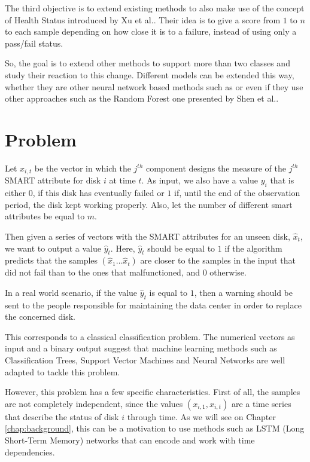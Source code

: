 The third objective is to extend existing methods to also make use of the concept of Health Status introduced by Xu et al.\cite{Xu16}.
Their idea is to give a score from $1$ to $n$ to each sample depending on how close it is to a failure, instead of using only a pass/fail status.

So, the goal is to extend other methods to support more than two classes and study their reaction to this change.
Different models can be extended this way, whether they are other neural network based methods such as \cite{Zhu13} or even if they use other approaches such as the Random Forest one presented by Shen et al.\cite{Shen18}.  

\section{Problem}\label{sec:problem}

Let $x_{i,t}$ be the vector in which the $j^{th}$ component designs the measure of the $j^{th}$ SMART attribute for disk $i$ at time $t$.
As input, we also have a value $y_i$ that is either $0$, if this disk has eventually failed or $1$ if, until the end of the observation period, the disk kept working properly.
Also, let the number of different smart attributes be equal to $m$.

Then given a series of vectors with the SMART attributes for an unseen disk, $\hat{x}_t$, we want to output a value $\hat{y}_t$.
Here, $\hat{y}_t$ should be equal to $1$ if the algorithm predicts that the samples $\left(\hat{x}_1\dots\hat{x}_t\right)$ are closer to the samples in the input that did not fail than to the ones that malfunctioned, and $0$ otherwise.

In a real world scenario, if the value $\hat{y}_t$ is equal to $1$, then a warning should be sent to the people responsible for maintaining the data center in order to replace the concerned disk.

This corresponds to a classical classification problem.
The numerical vectors as input and a binary output suggest that machine learning methods such as Classification Trees\cite{Li14}, Support Vector Machines\cite{Zhu13} and Neural Networks\cite{Xu16} are well adapted to tackle this problem.

However, this problem has  a few specific characteristics.
First of all, the samples are not completely independent, since the values $\left(x_{i,1},x_{i,t}\right)$ are a time series that describe the status of disk $i$ through time.
As we will see on Chapter \ref{chap:background}, this can be a motivation to use methods such as LSTM (Long Short-Term Memory) networks that can encode and work with time dependencies.

